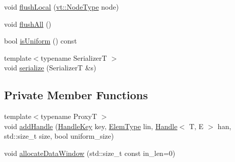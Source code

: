 \begin{DoxyCompactItemize}
\item 
void \hyperlink{structvt_1_1rdma_1_1_holder_a4b576d334034884d7c72b89310fd4f57}{flush\+Local} (\hyperlink{namespacevt_a866da9d0efc19c0a1ce79e9e492f47e2}{vt\+::\+Node\+Type} node)
\item 
void \hyperlink{structvt_1_1rdma_1_1_holder_a667a140d3db4f68da8af0f9d6533a88a}{flush\+All} ()
\item 
bool \hyperlink{structvt_1_1rdma_1_1_holder_af5a5f41fb16fbf8ee0f7f1b51120cb65}{is\+Uniform} () const
\item 
{\footnotesize template$<$typename SerializerT $>$ }\\void \hyperlink{structvt_1_1rdma_1_1_holder_ab01f8e7262a04ba7d86501968e2b177d}{serialize} (SerializerT \&s)
\end{DoxyCompactItemize}
\subsection*{Private Member Functions}
\begin{DoxyCompactItemize}
\item 
{\footnotesize template$<$typename ProxyT $>$ }\\void \hyperlink{structvt_1_1rdma_1_1_holder_ab5feb3bca7aad2b37c7249f3abf7ab05}{add\+Handle} (\hyperlink{structvt_1_1rdma_1_1_handle_key}{Handle\+Key} key, \hyperlink{namespacevt_1_1rdma_a38e310504e675aa1bcaf7811019b0df2}{Elem\+Type} lin, \hyperlink{structvt_1_1rdma_1_1_handle}{Handle}$<$ T, E $>$ han, std\+::size\+\_\+t size, bool uniform\+\_\+size)
\item 
void \hyperlink{structvt_1_1rdma_1_1_holder_a7dc5e735fb6f919dabec8e118683b4ae}{allocate\+Data\+Window} (std\+::size\+\_\+t const in\+\_\+len=0)
\end{DoxyCompactItemize}
